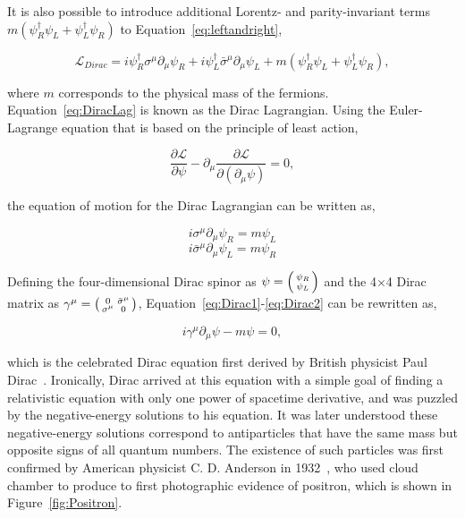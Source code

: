 It is also possible to introduce additional Lorentz- and parity-invariant terms $m(\psi_{R}^{\dagger}\psi_{L}+\psi_{L}^{\dagger}\psi_{R})$ to Equation~\ref{eq:leftandright},

\begin{equation}
\label{eq:DiracLag}
\mathcal{L}_{Dirac}=i\psi_{R}^{\dagger}\sigma^{\mu}\partial_{\mu}\psi_{R}+i\psi_{L}^{\dagger}\bar{\sigma}^{\mu}\partial_{\mu}\psi_{L}+m(\psi_{R}^{\dagger}\psi_{L}+\psi_{L}^{\dagger}\psi_{R}),
\end{equation}

where $m$ corresponds to the physical mass of the fermions. Equation~\ref{eq:DiracLag} is known as the Dirac Lagrangian. Using the Euler-Lagrange equation that is based on the principle of least action,

\begin{equation}
\frac{\partial\mathcal{L}}{\partial\psi}-\partial_{\mu}\frac{\partial\mathcal{L}}{\partial(\partial_{\mu}\psi)}=0,
\end{equation}

the equation of motion for the Dirac Lagrangian can be written as,

\begin{equation}
\label{eq:Dirac1}
i\sigma^{\mu}\partial_{\mu}\psi_{R}=m\psi_{L}
\end{equation}
\begin{equation}
\label{eq:Dirac2}
i\bar{\sigma}^{\mu}\partial_{\mu}\psi_{L}=m\psi_{R}
\end{equation}

Defining the four-dimensional Dirac spinor as $\psi=\begin{psmallmatrix}\psi_{R}\\\psi_{L}\end{psmallmatrix}$ and the 4$\times$4 Dirac matrix as $\gamma^{\mu}=\begin{psmallmatrix}0&\bar{\sigma}^{\mu}\\\sigma^{\mu}&0\end{psmallmatrix}$, Equation~\ref{eq:Dirac1}-\ref{eq:Dirac2} can be rewritten as,

\begin{equation}
\label{eq:Dirac}
i\gamma^{\mu}\partial_{\mu}\psi-m\psi=0,
\end{equation}

which is the celebrated Dirac equation first derived by British physicist Paul Dirac~\cite{Dirac:1928hu}. Ironically, Dirac arrived at this equation with a simple goal of finding a relativistic equation with only one power of spacetime derivative, and was puzzled by the negative-energy solutions to his equation. It was later understood these negative-energy solutions correspond to antiparticles that have the same mass but opposite signs of all quantum numbers. The existence of such particles was first confirmed by American physicist C. D. Anderson in 1932~\cite{PhysRev.43.491}, who used cloud chamber to produce to first photographic evidence of positron, which is shown in Figure~\ref{fig:Positron}.

